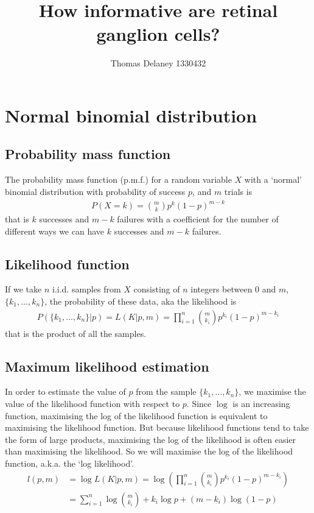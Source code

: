\documentclass[a4paper,12pt]{article}
\title{How informative are retinal ganglion cells?}
\author{Thomas Delaney 1330432}
\theoremstyle{definition}
\begin{document}
\section{Normal binomial distribution}\label{normal}
\subsection{Probability mass function}
The probability mass function (p.m.f.) for a random variable $X$ with a `normal' binomial distribution with probability of success $p$, and $m$ trials is
\begin{align}
  P(X=k) = \binom{m}{k} p^k (1-p)^{m-k}
\end{align}
that is $k$ successes and $m-k$ failures with a coefficient for the number of different ways we can have $k$ successes and $m-k$ failures. 

\subsection{Likelihood function}
If we take $n$ i.i.d. samples from $X$ consisting of $n$ integers between $0$ and $m$, $\lbrace k_1, \dots , k_n \rbrace$, the probability of these data, aka the likelihood is
\begin{align}
  P(\lbrace k_1, \dots , k_n \rbrace | p) = L(K|p, m) = \prod_{i=1}^n \binom{m}{k_i} p^{k_i}(1-p)^{m-k_i}
\end{align}
that is the product of all the samples.

\subsection{Maximum likelihood estimation}
In order to estimate the value of $p$ from the sample $\lbrace k_1, \dots , k_n \rbrace$, we maximise the value of the likelihood function with respect to $p$. Since $\log$ is an increasing function, maximising the log of the likelihood function is equivalent to maximising the likelihood function. But because likelihood functions tend to take the form of large products, maximising the log of the likelihood is often easier than maximising the likelihood. So we will maximise the log of the likelihood function, a.k.a. the `log likelihood'.
\begin{align}
  l(p, m)  &= \log L(K|p, m) = \log \left( \prod_{i=1}^n \binom{m}{k_i} p^{k_i}(1-p)^{m-k_i} \right) \\
        &= \sum_{i=1}^n \log \binom{m}{k_i} +  k_i \log p + (m - k_i) \log (1-p) 
\end{align}
\end{document}
